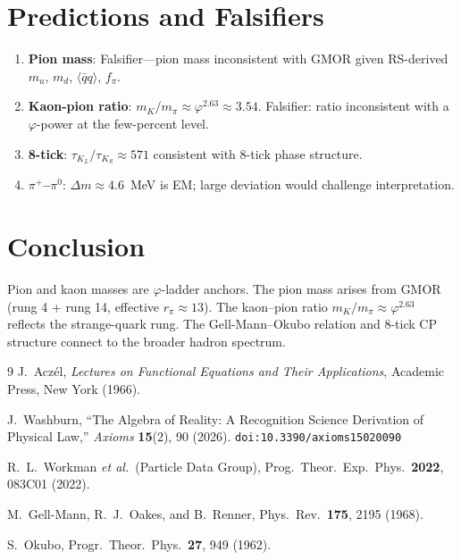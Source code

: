 \documentclass[12pt,a4paper]{article}
\theoremstyle{definition}
\theoremstyle{remark}
\begin{document}
\section{Predictions and Falsifiers}
\label{sec:predictions}

\begin{enumerate}
  \item \textbf{Pion mass}: Falsifier---pion mass inconsistent with
  GMOR given RS-derived $m_u$, $m_d$, $\langle\bar{q}q\rangle$, $f_\pi$.
  \item \textbf{Kaon-pion ratio}: $m_K/m_\pi \approx \varphi^{2.63}
  \approx 3.54$.  Falsifier: ratio inconsistent with a $\varphi$-power
  at the few-percent level.
  \item \textbf{8-tick}: $\tau_{K_L}/\tau_{K_S} \approx 571$ consistent
  with 8-tick phase structure.
  \item \textbf{$\pi^+$--$\pi^0$}: $\Delta m \approx 4.6$~MeV is EM;
  large deviation would challenge interpretation.
\end{enumerate}

\section{Conclusion}
\label{sec:conclusion}

Pion and kaon masses are $\varphi$-ladder anchors.  The pion mass
arises from GMOR (rung 4 + rung 14, effective $r_\pi \approx 13$).
The kaon--pion ratio $m_K/m_\pi \approx \varphi^{2.63}$ reflects the
strange-quark rung.  The Gell-Mann--Okubo relation and 8-tick CP
structure connect to the broader hadron spectrum.

\begin{thebibliography}{9}
J.~Acz\'el, \emph{Lectures on Functional Equations and Their Applications},
Academic Press, New York (1966).

J.~Washburn, ``The Algebra of Reality: A Recognition Science Derivation
of Physical Law,'' \emph{Axioms} \textbf{15}(2), 90 (2026).
\texttt{doi:10.3390/axioms15020090}

R.~L.~Workman \textit{et al.}\ (Particle Data Group), Prog.\ Theor.\
Exp.\ Phys.\ \textbf{2022}, 083C01 (2022).

M.~Gell-Mann, R.~J.~Oakes, and B.~Renner, Phys.\ Rev.\ \textbf{175},
2195 (1968).

S.~Okubo, Progr.\ Theor.\ Phys.\ \textbf{27}, 949 (1962).
\end{thebibliography}
\end{document}
